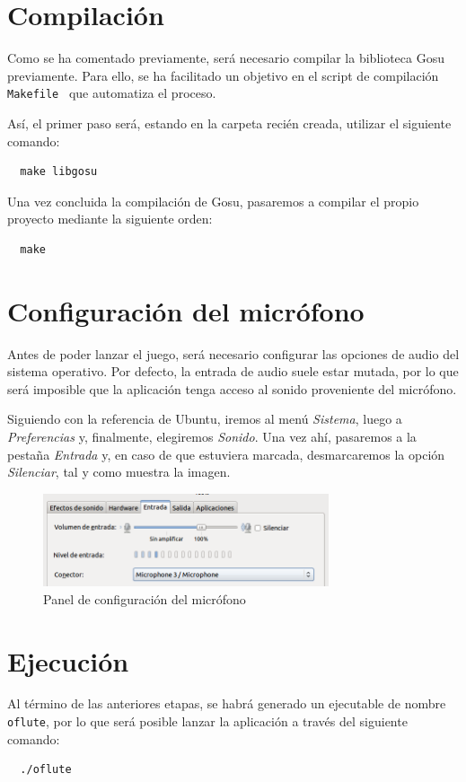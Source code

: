 \section{Compilación}

Como se ha comentado previamente, será necesario compilar la biblioteca Gosu
previamente. Para ello, se ha facilitado un objetivo en el script de compilación
\texttt{Makefile}~\cite{refmakefile} que automatiza el proceso.

Así, el primer paso será, estando en la carpeta recién creada, utilizar el
siguiente comando:

\begin{verbatim}
  make libgosu
\end{verbatim}

Una vez concluida la compilación de Gosu, pasaremos a compilar el propio
proyecto mediante la siguiente orden:

\begin{verbatim}
  make
\end{verbatim}

\section{Configuración del micrófono}
Antes de poder lanzar el juego, será necesario configurar las opciones de audio
del sistema operativo. Por defecto, la entrada de audio suele estar mutada, por
lo que será imposible que la aplicación tenga acceso al sonido proveniente del
micrófono.

Siguiendo con la referencia de Ubuntu, iremos al menú \textit{Sistema}, luego a
\textit{Preferencias} y, finalmente, elegiremos \textit{Sonido}. Una vez ahí,
pasaremos a la pestaña \textit{Entrada} y, en caso de que estuviera marcada,
desmarcaremos la opción \textit{Silenciar}, tal y como muestra la imagen.

\begin{figure}[h!]
  \centering
  \includegraphics[width=0.75\textwidth]{apendice_manual_instalacion/imagen_captura_1}
  \caption{Panel de configuración del micrófono}
\end{figure}

\vspace{-1cm}

\section{Ejecución}

Al término de las anteriores etapas, se habrá generado un ejecutable de nombre
\texttt{oflute}, por lo que será posible lanzar la aplicación a través del
siguiente comando:

\begin{verbatim}
  ./oflute
\end{verbatim}

